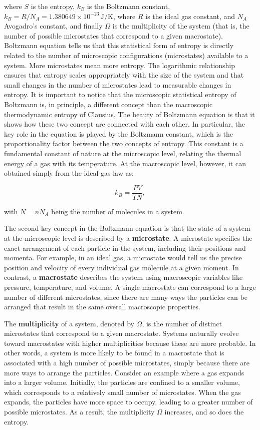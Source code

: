 \documentclass[
  9pt,
]{extbook}
\theoremstyle{definition}
\theoremstyle{definition}
\theoremstyle{definition}
\theoremstyle{definition}
\theoremstyle{remark}
\begin{document}
where \(S\) is the entropy, \(k_B\) is the Boltzmann constant, \(k_B = R/N_A = 1.380649 \times 10^{-23} \, \text{J/K}\), where \(R\) is the ideal gas constant, and \(N_A\) Avogadro's constant, and finally \(\Omega\) is the multiplicity of the system (that is, the number of possible microstates that correspond to a given macrostate). Boltzmann equation tells us that this statistical form of entropy is directly related to the number of microscopic configurations (microstates) available to a system. More microstates mean more entropy. The logarithmic relationship ensures that entropy scales appropriately with the size of the system and that small changes in the number of microstates lead to measurable changes in entropy. It is important to notice that the microscopic statistical entropy of Boltzmann is, in principle, a different concept than the macroscopic thermodynamic entropy of Clausius. The beauty of Boltzmann equation is that it shows how these two concept are connected with each other. In particular, the key role in the equation is played by the Boltzmann constant, which is the proportionality factor between the two concepts of entropy. This constant is a fundamental constant of nature at the microscopic level, relating the thermal energy of a gas with its temperature. At the macroscopic level, however, it can obtained simply from the ideal gas law as:

\begin{equation}
k_B = \frac{PV}{TN},
\label{eq:stat2}
\end{equation}

with \(N=nN_A\) being the number of molecules in a system.

The second key concept in the Boltzmann equation is that the state of a system at the microscopic level is described by a \textbf{microstate}. A microstate specifies the exact arrangement of each particle in the system, including their positions and momenta. For example, in an ideal gas, a microstate would tell us the precise position and velocity of every individual gas molecule at a given moment. In contrast, a \textbf{macrostate} describes the system using macroscopic variables like pressure, temperature, and volume. A single macrostate can correspond to a large number of different microstates, since there are many ways the particles can be arranged that result in the same overall macroscopic properties.

The \textbf{multiplicity} of a system, denoted by \(\Omega\), is the number of distinct microstates that correspond to a given macrostate. Systems naturally evolve toward macrostates with higher multiplicities because these are more probable. In other words, a system is more likely to be found in a macrostate that is associated with a high number of possible microstates, simply because there are more ways to arrange the particles. Consider an example where a gas expands into a larger volume. Initially, the particles are confined to a smaller volume, which corresponds to a relatively small number of microstates. When the gas expands, the particles have more space to occupy, leading to a greater number of possible microstates. As a result, the multiplicity \(\Omega\) increases, and so does the entropy.
\end{document}

